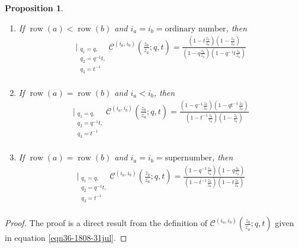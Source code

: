 \documentclass[12pt,reqno,a4paper]{amsart}
\newcommand{\cals}[1]{\mathcal{#1}}
\numberwithin{equation}{section}
\newtheorem{prop}[thm]{Proposition}
\theoremstyle{definition}
\begin{document}
\begin{prop}
\begin{enumerate}[(1)]
\begin{align}
		\label{C9-1704-21jul}
	\end{align}
	\normalsize
	\item If $\operatorname{row}(a) < \operatorname{row}(b)$ and $i_a = i_b = \text{ordinary number}$, then 
	\footnotesize
	\begin{align}
		\bigg|_{
			\substack{
				q_1 = q, \\
				q_2 = q^{-1}t,\\
				q_3 = t^{-1} \\
			}
		}
		\cals{C}^{(i_a,i_b)}\left(
		\frac{z_b}{z_a}
		; q, t
		\right)
		= 
		\frac{
			\left(1 - t\frac{z_b}{z_a}\right)
			\left(1 - \frac{z_b}{z_a}\right)
		}{
			\left(1 - q\frac{z_b}{z_a}\right)
			\left(1 - q^{-1}t\frac{z_b}{z_a}\right)
		}
		\label{C10-1704-21jul}
	\end{align}
	\normalsize
	\item If $\operatorname{row}(a) = \operatorname{row}(b)$ and $i_a < i_b$, then 
	\footnotesize
	\begin{align}
		\bigg|_{
			\substack{
				q_1 = q, \\
				q_2 = q^{-1}t,\\
				q_3 = t^{-1} \\
			}
		}
		\cals{C}^{(i_a,i_b)}\left(
		\frac{z_b}{z_a}
		; q, t
		\right)
		= 
		\frac{
			\left(1 - q^{-1}\frac{z_b}{z_a}\right)
			\left(1 - qt^{-1}\frac{z_b}{z_a}\right)
		}{
			\left(1 - t^{-1}\frac{z_b}{z_a}\right)
			\left(1 - \frac{z_b}{z_a}\right)
		}
	\end{align}
	\normalsize
	\item If $\operatorname{row}(a) = \operatorname{row}(b)$ and $i_a = i_b = \text{supernumber}$, then 
	\footnotesize
	\begin{align}
		\bigg|_{
			\substack{
				q_1 = q, \\
				q_2 = q^{-1}t,\\
				q_3 = t^{-1} \\
			}
		}
		\cals{C}^{(i_a,i_b)}\left(
		\frac{z_b}{z_a}
		; q, t
		\right)
		= 
		\frac{
			\left(1 - q^{-1}\frac{z_b}{z_a}\right)
			\left(1 - q\frac{z_b}{z_a}\right)
		}{
			\left(1 - t^{-1}\frac{z_b}{z_a}\right)
			\left(1 - t\frac{z_b}{z_a}\right)
		}
	\end{align}
	\normalsize
\end{enumerate}
\end{prop}
\begin{proof}
The proof is a direct result from the definition of $\cals{C}^{(i_a,i_b)}\left(
\frac{z_b}{z_a}
; q, t
\right)$ 
given in equation \eqref{eqn36-1808-31jul}. 
\end{proof}
\end{document}
